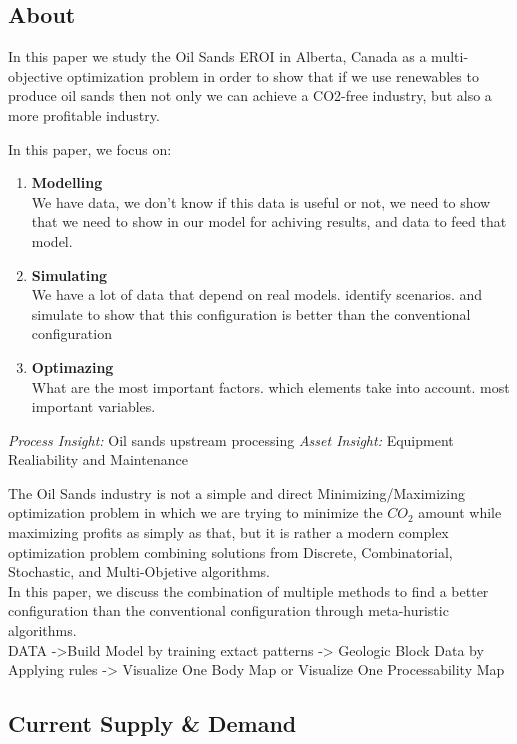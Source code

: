 \documentclass[12pt]{article}
\begin{document}
\subsection{About}
In this paper we study the Oil Sands EROI in Alberta, Canada as a multi-objective optimization problem in order to show that if we use renewables to produce oil sands then not only we can achieve a CO2-free industry, but also a more profitable industry. 

In this paper, we focus on: 
\begin{enumerate}
\item {\bf Modelling} \\
We have data, we don't know if this data is useful or not, we need to show that we
need to show in our model for achiving results, and data to feed that model. 
\item {\bf Simulating} \\
We have a lot of data that depend on real models. identify scenarios. and simulate to 
show that this configuration is better than the conventional configuration 
\item {\bf Optimazing} \\
What are the most important factors. which elements take into account. most important
variables. \\
\end{enumerate}

{\em Process Insight:} Oil sands upstream processing
{\em Asset Insight:} Equipment Realiability and Maintenance

The Oil Sands industry is not a simple and direct Minimizing/Maximizing optimization problem in which we are trying to minimize the $CO_2$ amount while maximizing profits as simply as that, but it is rather a modern complex optimization problem combining solutions from Discrete, Combinatorial, Stochastic, and Multi-Objetive algorithms. \\

In this paper, we discuss the combination of multiple methods to find a better configuration than the conventional configuration through meta-huristic algorithms. \\

DATA ->Build Model  by training extact patterns -> Geologic Block Data by Applying rules -> Visualize One Body Map or Visualize One Processability Map

\subsection{Current Supply \& Demand}
\end{document}
